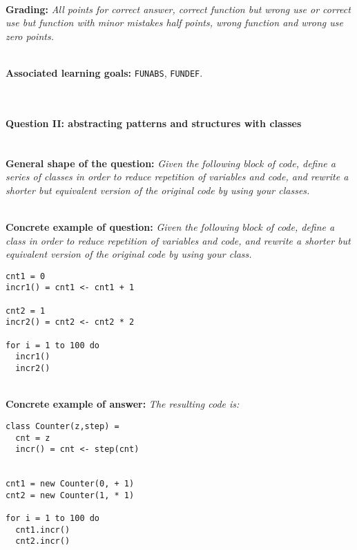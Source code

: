 \documentclass[12pt,a4paper,final]{article}
\begin{document}
\ \\ 

\textbf{Grading:} \textit{All points for correct answer, correct function but wrong use or correct use but function with minor mistakes half points, wrong function and wrong use zero points.}

\ \\ 

\textbf{Associated learning goals:} \texttt{FUNABS}, \texttt{FUNDEF}.

\ \\ 

\paragraph{Question II: abstracting patterns and structures with classes} \ \\

\textbf{General shape of the question:} \textit{Given the following block of code, define a series of classes in order to reduce repetition of variables and code, and rewrite a shorter but equivalent version of the original code by using your classes.}

\ \\ 

\textbf{Concrete example of question:} \textit{Given the following block of code, define a class in order to reduce repetition of variables and code, and rewrite a shorter but equivalent version of the original code by using your class.}

\begin{lstlisting}
cnt1 = 0
incr1() = cnt1 <- cnt1 + 1

cnt2 = 1
incr2() = cnt2 <- cnt2 * 2

for i = 1 to 100 do
  incr1()
  incr2()
\end{lstlisting}

\ \\ 

\textbf{Concrete example of answer:} \textit{The resulting code is:}

\begin{lstlisting}
class Counter(z,step) =
  cnt = z
  incr() = cnt <- step(cnt)


cnt1 = new Counter(0, + 1)
cnt2 = new Counter(1, * 1)

for i = 1 to 100 do
  cnt1.incr()
  cnt2.incr()
\end{lstlisting}

\ \\ 
\end{document}
